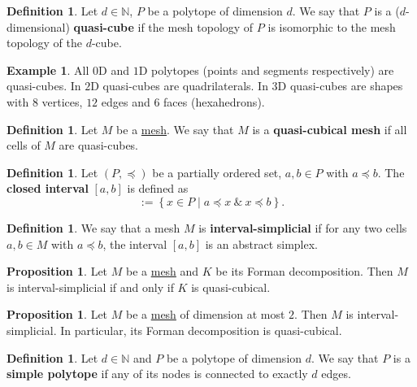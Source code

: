 \documentclass[fleqn]{article}
\theoremstyle{definition}
\newtheorem{proposition}[theorem]{Proposition}
\newtheorem{definition}[theorem]{Definition}
\newtheorem{example}[theorem]{Example}
\newcommand{\N}{\mathbb{N}}
\newcommand{\set}[2]{\left\{ #1 \mid #2 \right\}}
\begin{document}
\begin{definition}
  Let $d \in \N$, $P$ be a polytope of dimension $d$.
  We say that $P$ is a ($d$-dimensional) \textbf{quasi-cube} if the mesh
  topology of $P$ is isomorphic to the mesh topology of the $d$-cube.
\end{definition}

\begin{example}
  All $0$D and $1$D polytopes (points and segments respectively)
  are quasi-cubes.
  In $2$D quasi-cubes are quadrilaterals.
  In $3$D quasi-cubes are shapes
  with $8$ vertices, $12$ edges and $6$ faces (hexahedrons).
\end{example}

\begin{definition}
  Let $M$ be a \hyperref[idec:mesh:definition]{mesh}.
  We say that $M$ is a \textbf{quasi-cubical mesh}
  if all cells of $M$ are quasi-cubes.
\end{definition}

\begin{definition}
  Let
    $(P, \preceq)$ be a partially ordered set,
    $a, b \in P$ with $a \preceq b$.
  The \textbf{closed interval} $[a, b]$ is defined as
  \begin{equation}
    [a, b] := \set{x \in P}{a \preceq x\ \&\ x \preceq b}.
  \end{equation}
\end{definition}

\begin{definition}
  We say that a mesh $M$ is \textbf{interval-simplicial} if for any two cells
  $a, b \in M$ with $a \preceq b$, the interval $[a, b]$ is an abstract simplex. 
\end{definition}

\begin{proposition}
  Let
    $M$ be a \hyperref[idec:mesh:definition]{mesh}
    and $K$ be its Forman decomposition.
  Then $M$ is interval-simplicial if and only if $K$ is quasi-cubical.
\end{proposition}

\begin{proposition}
  Let $M$ be a \hyperref[idec:mesh:definition]{mesh} of dimension at most $2$.
  Then $M$ is interval-simplicial.
  In particular, its Forman decomposition is quasi-cubical.
\end{proposition}

\begin{definition}
  Let $d \in \N$ and $P$ be a polytope of dimension $d$.
  We say that $P$ is a \textbf{simple polytope}
  if any of its nodes is connected to exactly $d$ edges.
\end{definition}
\end{document}
